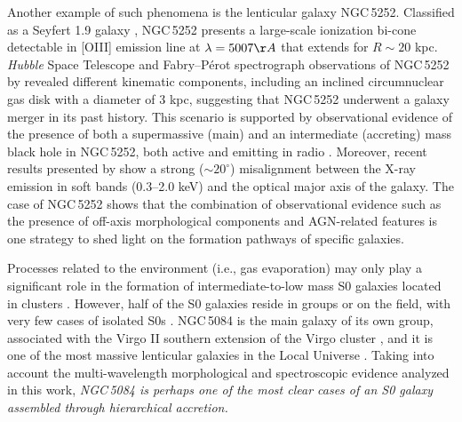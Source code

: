 \documentclass[modern]{CORE-AAS/aastex631}
\begin{document}
{Another example of such phenomena is the lenticular galaxy NGC\,5252. Classified as a Seyfert 1.9 galaxy \citep{argyle+1990mnras243_504, osterbrock+1993apj414_552}, NGC\,5252 presents a large-scale ionization bi-cone \citep{tadhunter+1989nat341_422} detectable in [OIII] emission line at $\lambda=5007\AA$ that extends for $R\sim20$ kpc. \emph{Hubble} Space Telescope and Fabry--P\'{e}rot spectrograph observations of NGC\,5252 by \citet{morse+1998apj505_159} revealed different kinematic components, including an inclined circumnuclear gas disk with a diameter of 3 kpc, suggesting that NGC\,5252 underwent a galaxy merger in its past history. This scenario is supported by observational evidence of the presence of both a supermassive (main) and an intermediate (accreting) mass black hole in NGC\,5252, both active and emitting in radio \citep{kim+2015apj814_8, kim+2017apj844_21, yang+2017mnras464_70}. Moreover, recent results presented by \citet{wang+2024arXiv2401.09172} show a strong ($\sim20^{\circ}$) misalignment between the X-ray emission in soft bands (0.3--2.0 keV) and the optical major axis of the galaxy. The case of NGC\,5252 shows that the combination of observational evidence such as the presence of off-axis morphological components and AGN-related features is one strategy to shed light on the formation pathways of specific galaxies. 


Processes related to the environment (i.e., gas evaporation) may only play a significant role in the formation of intermediate-to-low mass S0 galaxies located in clusters \citep{vollmer+2012aap537_143, cerulo+2017mnras472_254}. However, half of the S0 galaxies reside in groups or on the field, with very few cases of isolated S0s \citep{khim+2015apj220_3}. NGC\,5084 is the main galaxy of its own group, associated with the Virgo II southern extension of the Virgo cluster \citep{tully1982apj257_389}, and it is one of the most massive lenticular galaxies in the Local Universe \citep[more massive than 98\% of the S0 galaxies]{ohlson+2024aj167_31}. Taking into account the multi-wavelength morphological and spectroscopic evidence analyzed in this work, \emph{NGC\,5084 is perhaps one of the most clear cases of an S0 galaxy assembled through hierarchical accretion.}


}
\end{document}
